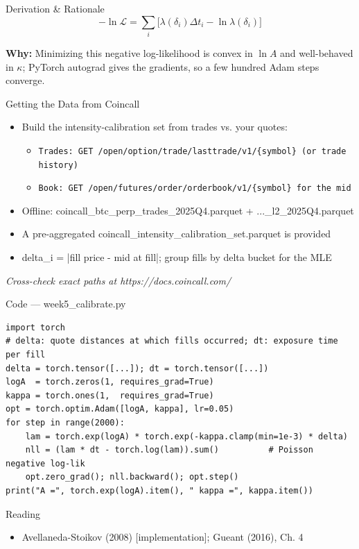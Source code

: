 \documentclass[aspectratio=169,10pt]{beamer}
\begin{document}
\begin{frame}{Derivation \& Rationale}
\[-\ln\mathcal{L} = \sum_i\big[\lambda(\delta_i)\Delta t_i - \ln\lambda(\delta_i)\big]\]

\small\textbf{\color{ncsured}Why:} Minimizing this negative log-likelihood is convex in $\ln A$ and well-behaved in $\kappa$; PyTorch autograd gives the gradients, so a few hundred Adam steps converge.
\end{frame}

\begin{frame}{Getting the Data from Coincall}
\begin{itemize}
  \item Build the intensity-calibration set from trades vs. your quotes:
  \begin{itemize}\item \texttt{\small Trades:  GET /open/option/trade/lasttrade/v1/\{symbol\}  (or trade history)}\end{itemize}
  \begin{itemize}\item \texttt{\small Book:    GET /open/futures/order/orderbook/v1/\{symbol\}  for the mid}\end{itemize}
  \item Offline: coincall\_btc\_perp\_trades\_2025Q4.parquet + ...\_l2\_2025Q4.parquet
  \item A pre-aggregated coincall\_intensity\_calibration\_set.parquet is provided
  \item delta\_i = |fill price - mid at fill|; group fills by delta bucket for the MLE
\end{itemize}
\vspace{2pt}\tiny\textit{Cross-check exact paths at https://docs.coincall.com/}
\end{frame}

\begin{frame}[fragile]{Code --- week5\_calibrate.py}
\begin{lstlisting}
import torch
# delta: quote distances at which fills occurred; dt: exposure time per fill
delta = torch.tensor([...]); dt = torch.tensor([...])
logA  = torch.zeros(1, requires_grad=True)
kappa = torch.ones(1,  requires_grad=True)
opt = torch.optim.Adam([logA, kappa], lr=0.05)
for step in range(2000):
    lam = torch.exp(logA) * torch.exp(-kappa.clamp(min=1e-3) * delta)
    nll = (lam * dt - torch.log(lam)).sum()          # Poisson negative log-lik
    opt.zero_grad(); nll.backward(); opt.step()
print("A =", torch.exp(logA).item(), " kappa =", kappa.item())
\end{lstlisting}
\end{frame}
\begin{frame}{Reading}
\begin{itemize}
  \item Avellaneda-Stoikov (2008) [implementation]; Gueant (2016), Ch. 4
\end{itemize}
\end{frame}
\end{document}
